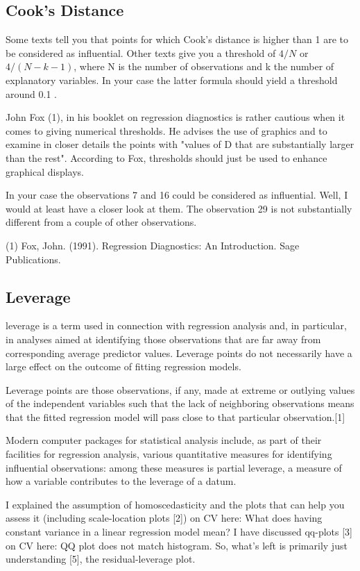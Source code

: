 \subsection{Cook's Distance}
Some texts tell you that points for which Cook's distance is higher than 1 are to be considered as influential. Other texts give you a threshold of $4/N$ or $4/(N−k−1)$, where N is the number of observations and k the number of explanatory variables. In your case the latter formula should yield a threshold around 0.1 .

John Fox (1), in his booklet on regression diagnostics is rather cautious when it comes to giving numerical thresholds. He advises the use of graphics and to examine in closer details the points with "values of D that are substantially larger than the rest". According to Fox, thresholds should just be used to enhance graphical displays.

In your case the observations 7 and 16 could be considered as influential. Well, I would at least have a closer look at them. The observation 29 is not substantially different from a couple of other observations.

(1) Fox, John. (1991). Regression Diagnostics: An Introduction. Sage Publications.
\subsection{Leverage}
 leverage is a term used in connection with regression analysis and, in particular, in analyses aimed at identifying those observations that are far away from corresponding average predictor values. Leverage points do not necessarily have a large effect on the outcome of fitting regression models.

Leverage points are those observations, if any, made at extreme or outlying values of the independent variables such that the lack of neighboring observations means that the fitted regression model will pass close to that particular observation.[1]

Modern computer packages for statistical analysis include, as part of their facilities for regression analysis, various quantitative measures for identifying influential observations: among these measures is partial leverage, a measure of how a variable contributes to the leverage of a datum.


\newpage
 I explained the assumption of homoscedasticity and the plots that can help you assess it (including scale-location plots [2]) on CV here: What does having constant variance in a linear regression model mean? I have discussed qq-plots [3] on CV here: QQ plot does not match histogram. So, what's left is primarily just understanding [5], the residual-leverage plot.

